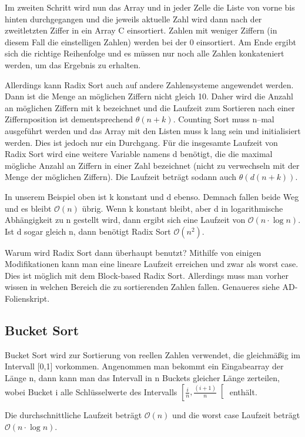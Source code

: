 \documentclass[10pt,a4paper,oneside,ngerman,numbers=noenddot]{scrartcl}
\begin{document}
		Im zweiten Schritt wird nun das Array und in jeder Zelle die Liste von vorne bis hinten durchgegangen und die jeweils aktuelle Zahl wird dann nach der zweitletzten Ziffer in ein Array C einsortiert. Zahlen mit weniger Ziffern (in diesem Fall die einstelligen Zahlen) werden bei der 0 einsortiert. Am Ende ergibt sich die richtige Reihenfolge und es müssen nur noch alle Zahlen konkateniert werden, um das Ergebnis zu erhalten.
		
		Allerdings kann Radix Sort auch auf andere Zahlensysteme angewendet werden. Dann ist die Menge an möglichen Ziffern nicht gleich 10. Daher wird die Anzahl an möglichen Ziffern mit k bezeichnet und die Laufzeit zum Sortieren nach einer Ziffernposition ist dementsprechend $\theta(n + k)$. Counting Sort muss n--mal ausgeführt werden und das Array mit den Listen muss k lang sein und initialisiert werden. Dies ist jedoch nur ein Durchgang. Für die insgesamte Laufzeit von Radix Sort wird eine weitere Variable namens d benötigt, die die maximal mögliche Anzahl an Ziffern in einer Zahl bezeichnet (nicht zu verwechseln mit der Menge der möglichen Ziffern). Die Laufzeit beträgt sodann auch $\theta(d(n + k))$.
		
		In unserem Beispiel oben ist k konstant und d ebenso. Demnach fallen beide Weg und es bleibt $\mathcal{O}(n)$ übrig. Wenn k konstant bleibt, aber d in logarithmische Abhängigkeit zu n gestellt wird, dann ergibt sich eine Laufzeit von $\mathcal{O}(n \cdot \log n)$. Ist d sogar gleich n, dann benötigt Radix Sort $\mathcal{O}(n^{2})$.
		
		Warum wird Radix Sort dann überhaupt benutzt? Mithilfe von einigen Modifikationen kann man eine lineare Laufzeit erreichen und zwar als worst case. Dies ist möglich mit dem Block-based Radix Sort. Allerdings muss man vorher wissen in welchen Bereich die zu sortierenden Zahlen fallen. Genaueres siehe AD-Folienskript.
		
	\subsection{Bucket Sort}
	
		Bucket Sort wird zur Sortierung von reellen Zahlen verwendet, die gleichmäßig im Intervall [0,1] vorkommen. Angenommen man bekommt ein Eingabearray der Länge n, dann kann man das Intervall in n Buckets gleicher Länge zerteilen, wobei Bucket i alle Schlüsselwerte des Intervalls $\left[\frac{i}{n}, \frac{(i + 1)}{n}\right[$ enthält.
		
		Die durchschnittliche Laufzeit beträgt $\mathcal{O}(n)$ und die worst case Laufzeit beträgt $\mathcal{O}(n \cdot \log n)$.
		
\end{document}
